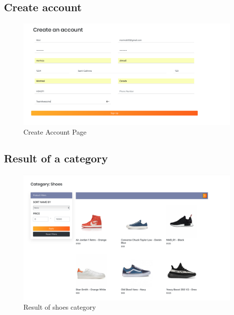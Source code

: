 \documentclass[11pt]{article}
\begin{document}
\subsection{Create account}
\begin{figure}[ht!]
    \centering
    \includegraphics[width=\textwidth,height=0.15\paperheight,keepaspectratio]{Diagrams/External_Interfaces/Create_Account.png} 
    \caption{Create Account Page}
    \label{fig: Create Account Page}
\end{figure}

\subsection{Result of a category}
\begin{figure}[ht!]
    \centering
    \includegraphics[width=\textwidth,height=0.15\paperheight,keepaspectratio]{Diagrams/External_Interfaces/Categories.png} 
    \caption{Result of shoes category}
    \label{fig: Result of a category}
\end{figure}
\end{document}

